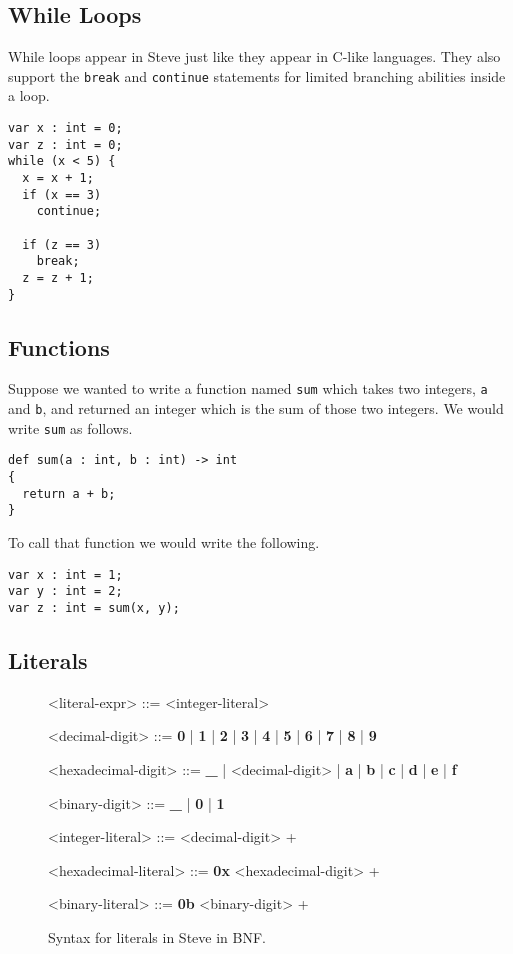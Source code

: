 \subsection{While Loops} \label{while_tut}

While loops appear in Steve just like they appear in C-like languages. They also support the \texttt{break} and \texttt{continue} statements for limited branching abilities inside a loop.

\begin{lstlisting}
var x : int = 0;
var z : int = 0;
while (x < 5) {
  x = x + 1;
  if (x == 3)
    continue;
	
  if (z == 3) 
    break;
  z = z + 1;
}
\end{lstlisting}

\subsection{Functions} \label{function_tut}

Suppose we wanted to write a function named \texttt{sum} which takes two integers, \texttt{a} and \texttt{b}, and returned an integer which is the sum of those two integers. We would write \texttt{sum} as follows.

\begin{lstlisting}
def sum(a : int, b : int) -> int
{
  return a + b;
}
\end{lstlisting}

To call that function we would write the following.

\begin{lstlisting}
var x : int = 1;
var y : int = 2;
var z : int = sum(x, y);
\end{lstlisting}

\subsection{Literals} \label{literal_tut}

\begin{figure}[ht]
\begin{mdframed}
\begin{grammar}
<literal-expr> ::=
<integer-literal>

<decimal-digit> ::= \textbf{0} | \textbf{1} | \textbf{2} | \textbf{3} | \textbf{4} | \textbf{5} | \textbf{6} | \textbf{7} | \textbf{8} | \textbf{9}

<hexadecimal-digit> ::= \textbf{\_} | <decimal-digit> | \textbf{a} | \textbf{b} | \textbf{c} | \textbf{d} | \textbf{e} | \textbf{f}             

<binary-digit> ::= \textbf{\_} | \textbf{0} | \textbf{1}

<integer-literal> ::=
<decimal-digit> +

<hexadecimal-literal> ::=
\textbf{0x} <hexadecimal-digit> +

<binary-literal> ::=
\textbf{0b} <binary-digit> +

\end{grammar}
\end{mdframed}
\caption{Syntax for literals in Steve in BNF.}
\label{fg:literal_syntax}
\end{figure}

